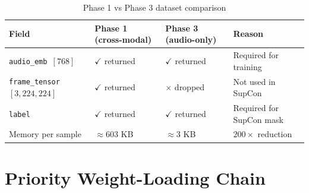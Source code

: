\documentclass[12pt,a4paper]{article}
\theoremstyle{definition}
\theoremstyle{remark}
\begin{document}
\begin{table}[H]
\centering
\caption{Phase 1 vs Phase 3 dataset comparison}
\begin{tabularx}{\textwidth}{lXXl}
\toprule
Field & Phase 1 (cross-modal) & Phase 3 (audio-only) & Reason \\
\midrule
\texttt{audio\_emb $[768]$} & $\checkmark$ returned & $\checkmark$ returned & Required for training \\
\texttt{frame\_tensor $[3,224,224]$} & $\checkmark$ returned & $\times$ dropped & Not used in SupCon \\
\texttt{label} & $\checkmark$ returned & $\checkmark$ returned & Required for SupCon mask \\
Memory per sample & $\approx$603 KB & $\approx$3 KB & $200\times$ reduction \\
\bottomrule
\end{tabularx}
\end{table}

\section{Priority Weight-Loading Chain}
\end{document}
